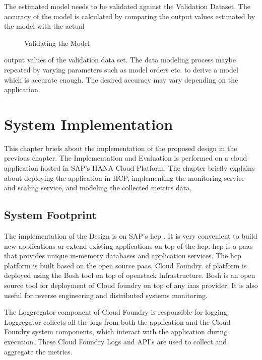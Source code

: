 \documentclass[article,type=msc,colorback,12pt,accentcolor=tud8b,table]{tudthesis}
\begin{document}
The estimated model needs to be validated against the Validation Dataset. The accuracy of the model is calculated by comparing the output values estimated by the model with the actual
\begin{figure}[H]
  	\begin{center}
  		\makebox[\textwidth]{\texttt{[image: C8]}}
  	\end{center}
  	\caption{Validating the Model}
  	\label{fig:data_modeling_flowchart}
  \end{figure}
  output values of the validation data set. The data modeling process maybe repeated by varying parameters such as model orders etc. to derive a model which is accurate enough. The desired accuracy may vary depending on the application.

 \cleardoublepage
 
 \hfill  
 \section{System Implementation}
 \hfill \break
 
This chapter briefs about the implementation of the proposed design in the previous chapter. The Implementation and Evaluation is performed on a cloud application hosted in SAP's HANA Cloud Platform. The chapter briefly explains about deploying the application in HCP, implementing the monitoring service and scaling service, and modeling the collected metrics data.

\subsection{System Footprint}
The implementation of the Design is on SAP's \gls{hcp} \cite{hcp}. It is very convenient to build new applications or extend existing applications on top of the \gls{hcp}. \gls{hcp} is a \gls{paas} that provides unique in-memory databases and application services. The \gls{hcp} platform is built based on the open source \gls{paas}, Cloud Foundry. \gls{cf} platform is deployed using the Bosh tool on top of openstack Infrastructure. Bosh is an open source tool for deployment of Cloud foundry on top of any \gls{iaas} provider. It is also useful for reverse engineering and distributed systems monitoring.

The Loggregator component of Cloud Foundry is responsible for logging. Loggregator collects all the logs from both the application and the Cloud Foundry system components, which interact with the application during execution. These Cloud Foundry Logs and API's are used to collect and aggregate the metrics. 
\end{document}
